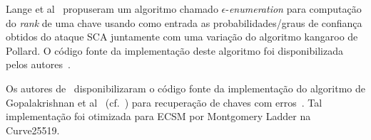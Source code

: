 \documentclass{SBCbookchapter}
\begin{document}
Lange et al~\cite{LangeVredendaalWakker2014} propuseram um algoritmo chamado $\epsilon$-\textit{enumeration} para computação do \emph{rank} de uma chave usando como entrada as probabilidades/graus de confiança obtidos do ataque SCA juntamente com uma variação do algoritmo kangaroo de Pollard. O código fonte da implementação deste algoritmo foi disponibilizada pelos autores~\cite{Vrendendaal-keyrecv-sckangaroo}.

Os autores de~\cite{Nascimento2016_SAC} disponibilizaram o código fonte da implementação do algoritmo de Gopalakrishnan et al~\cite{Gopalakrishnan2007} (cf.~) para recuperação de chaves com erros~\cite{Nascimento-github-ecc-keyrecv}. Tal implementação foi otimizada para ECSM por Montgomery Ladder na Curve25519.





\end{document}
